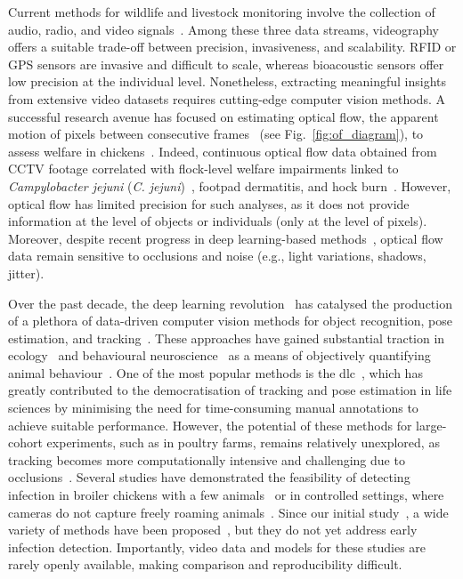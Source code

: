 Current methods for wildlife and livestock monitoring involve the collection of audio, radio, and video signals~\cite{tuia2022}. Among these three data streams, videography offers a suitable trade-off between precision, invasiveness, and scalability. RFID or GPS sensors are invasive and difficult to scale, whereas bioacoustic sensors offer low precision at the individual level. Nonetheless, extracting meaningful insights from extensive video datasets requires cutting-edge computer vision methods. A successful research avenue has focused on estimating optical flow, the apparent motion of pixels between consecutive frames~\cite{szeliski2022} (see Fig.~\ref{fig:of_diagram}), to assess welfare in chickens~\cite{dawkins2012, colles2016, dawkins2017, penafernandez2018, dawkins2021, gebhardt2021}. Indeed, continuous optical flow data obtained from CCTV footage correlated with flock-level welfare impairments linked to \textit{Campylobacter jejuni} (\textit{C. jejuni})~\cite{colles2016}, footpad dermatitis, and hock burn~\cite{dawkins2017}. However, optical flow has limited precision for such analyses, as it does not provide information at the level of objects or individuals (only at the level of pixels). Moreover, despite recent progress in deep learning-based methods~\cite{dosovitskiy2015, chen2016, hur2020, teed2020, wang2025}, optical flow data remain sensitive to occlusions and noise (e.g., light variations, shadows, jitter). %



Over the past decade, the deep learning revolution~\cite{lecun2015} has catalysed the production of a plethora of data-driven computer vision methods for object recognition, pose estimation, and tracking~\cite{zhao2019, zheng2023}. These approaches have gained substantial traction in ecology~\cite{brown2018} and behavioural neuroscience~\cite{mathis2020} as a means of objectively quantifying animal behaviour~\cite{anderson2014}. One of the most popular methods is the \gls{dlc}~\cite{mathis2018}, which has greatly contributed to the democratisation of tracking and pose estimation in life sciences by minimising the need for time-consuming manual annotations to achieve suitable performance. However, the potential of these methods for large-cohort experiments, such as in poultry farms, remains relatively unexplored, as tracking becomes more computationally intensive and challenging due to occlusions~\cite{zhou2023, han2025}. Several studies have demonstrated the feasibility of detecting infection in broiler chickens with a few animals~\cite{zhuang2019} or in controlled settings, where cameras do not capture freely roaming animals~\cite{doornweerd2021}. Since our initial study~\cite{scheidwasser2025c}, a wide variety of methods have been proposed~\cite{depuru2024,ehsan2024,yang2024}, but they do not yet address early infection detection. Importantly, video data and models for these studies are rarely openly available, making comparison and reproducibility difficult.

